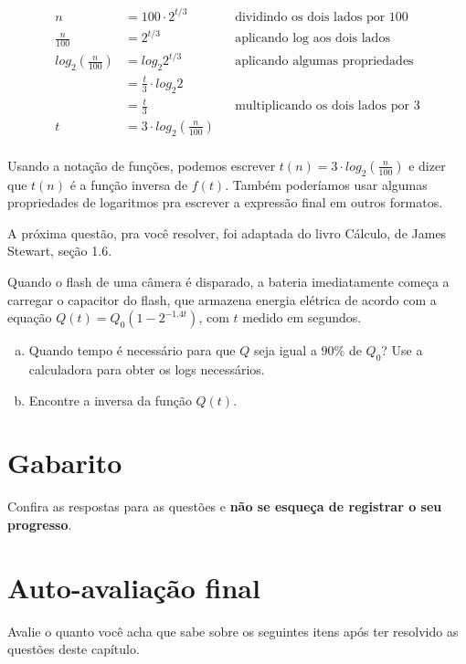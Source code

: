\documentclass[main.tex]{subfiles}
\begin{document}
\begin{align*}
n & {} = 100 \cdot 2^{t/3} && \text{dividindo os dois lados por 100}\\
\frac{n}{100} & {} = 2^{t/3} && \text{aplicando log aos dois lados} \\
log_2 (\frac{n}{100}) & {} = log_2 2^{t/3} && \text{aplicando algumas propriedades} \\
 & {} = \frac{t}{3} \cdot log_2 2 \\
 & {} = \frac{t}{3} && \text{multiplicando os dois lados por 3}\\
t & {} = 3 \cdot log_2 (\frac{n}{100}) \\
\end{align*}

Usando a notação de funções, podemos escrever $t(n) = 3 \cdot log_2 (\frac{n}{100})$ e dizer que $t(n)$ é a função inversa de $f(t)$. Também poderíamos usar algumas propriedades de logaritmos pra escrever a expressão final em outros formatos.

A próxima questão, pra você resolver, foi adaptada do livro Cálculo, de James Stewart, seção 1.6.

\begin{resolva}
Quando o flash de uma câmera é disparado, a bateria imediatamente começa a carregar o capacitor do flash, que armazena energia elétrica de acordo com a equação $Q(t)=Q_0(1-2^{-1.4t})$, com $t$ medido em segundos.
\begin{enumerate}[a)]
 \item Quando tempo é necessário para que $Q$ seja igual a $90\%$ de $Q_0$? Use a calculadora para obter os logs necessários.
 \item Encontre a inversa da função $Q(t)$.
\end{enumerate}
\end{resolva}

\newpage

\section{Gabarito}

Confira as respostas para as questões e \textbf{não se esqueça de registrar o seu progresso}.

\imprimeGabarito

\paraAlunos

\section{Auto-avaliação final}
Avalie o quanto você acha que sabe sobre os seguintes itens após ter resolvido as questões deste capítulo.
\end{document}
